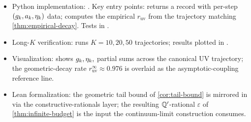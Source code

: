 \begin{itemize}
  \item Python implementation:
    .  Key entry points:
     returns a
     record with per-step $(g_k, a_k, \eta_k)$
    data;  computes the
    empirical $r_{\mathrm{uv}}$ from the trajectory matching
    \cref{thm:empirical-decay}.  Tests in
    .
  \item Long-$K$ verification:
     runs $K = 10,
    20, 50$ trajectories; results plotted in
    .
  \item Visualization:
    shows $g_k, \eta_k,$ partial sums across the canonical UV
    trajectory; the geometric-decay rate
    $r_{\mathrm{uv}}^\infty \approx 0.976$ is overlaid as the
    asymptotic-coupling reference line.
  \item Lean formalization: the geometric tail bound of
    \cref{cor:tail-bound} is mirrored in
     via the
    constructive-rationals layer; the resulting
    $\mathbb{Q}'$-rational $\varepsilon$ of \cref{thm:infinite-budget}
    is the input the continuum-limit construction consumes.
\end{itemize}
